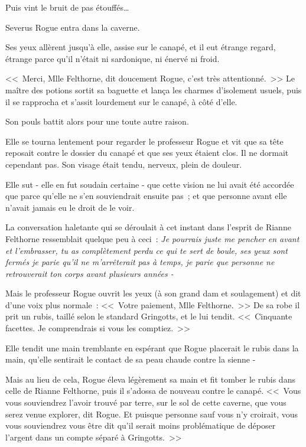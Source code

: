 Puis vint le bruit de pas étouffés…

Severus Rogue entra dans la caverne.

Ses yeux allèrent jusqu'à elle, assise sur le canapé, et il eut étrange regard, étrange parce qu'il n'était ni sardonique, ni énervé ni froid.

<<~Merci, Mlle Felthorne, dit doucement Rogue, c'est très attentionné.~>> Le maître des potions sortit sa baguette et lança les charmes d'isolement usuels, puis il se rapprocha et s'assit lourdement sur le canapé, à côté d'elle.

Son pouls battit alors pour une toute autre raison.

Elle se tourna lentement pour regarder le professeur Rogue et vit que sa tête reposait contre le dossier du canapé et que ses yeux étaient clos. Il ne dormait cependant pas. Son visage était tendu, nerveux, plein de douleur.

Elle sut - elle en fut soudain certaine - que cette vision ne lui avait été accordée que parce qu'elle ne s'en souviendrait ensuite pas~; et que personne avant elle n'avait jamais eu le droit de le voir.

La conversation haletante qui se déroulait à cet instant dans l'esprit de Rianne Felthorne ressemblait quelque peu à ceci~: \emph{Je pourrais juste me pencher en avant et l'embrasser, tu as complètement perdu ce qui te sert de boule, ses yeux sont fermés je parie qu'il ne m'arrêterait pas à temps, je parie que personne ne retrouverait ton corps avant plusieurs années -}

Mais le professeur Rogue ouvrit les yeux (à son grand dam et soulagement) et dit d'une voix plus normale~: <<~Votre paiement, Mlle Felthorne.~>> De sa robe il prit un rubis, taillé selon le standard Gringotts, et le lui tendit. <<~Cinquante facettes. Je comprendrais si vous les comptiez.~>>

Elle tendit une main tremblante en espérant que Rogue placerait le rubis dans la main, qu'elle sentirait le contact de sa peau chaude contre la sienne -

Mais au lieu de cela, Rogue éleva légèrement sa main et fit tomber le rubis dans celle de Rianne Felthorne, puis il s'adossa de nouveau contre le canapé. <<~Vous vous souviendrez l'avoir trouvé par terre, sur le sol de cette caverne, que vous serez venue explorer, dit Rogue. Et puisque personne sauf vous n'y croirait, vous vous souviendrez vous être dit qu'il serait moins problématique de déposer l'argent dans un compte séparé à Gringotts.~>>

